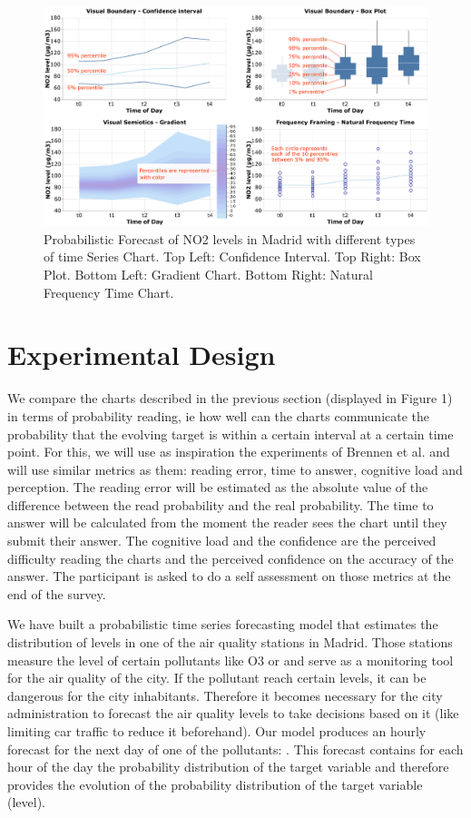 \documentclass[a4paper,3p,sort&compress]{elsarticle}
\begin{document}
\begin{figure}
  \centering
  \includegraphics[width=.9\textwidth]{charts_vector} 
  \caption{\label{figure:charts} Probabilistic Forecast of NO2 levels in Madrid with different types of time Series Chart. 
  Top Left: Confidence Interval. Top Right: Box Plot. 
  Bottom Left: Gradient Chart. Bottom Right: Natural Frequency Time Chart. }
\end{figure} 

\section{Experimental Design}
\label{sec:exp_design}

We compare the charts described in the previous section (displayed in Figure 1) 
in terms of probability 
reading, ie how well 
can the charts communicate the probability that the evolving target is within a certain interval 
at a certain time point.
 For this, we will use as inspiration the experiments of Brennen et al. \cite{brennen_instrument_2018}
and will use similar metrics 
as them: reading error, time to answer, cognitive load and perception. The reading error will be estimated as the 
absolute value of the difference between the read probability and the real probability. The time to answer 
will be calculated from the moment the reader sees the chart until they submit their answer. The cognitive 
load and the confidence are the perceived difficulty reading the charts and the perceived confidence on 
the accuracy of 
the answer. The participant is asked to do a self assessment on those metrics at the end of the survey.

We have built a probabilistic time series forecasting model that estimates the distribution of \no 
levels in one of the air quality stations in Madrid. Those stations measure the level of certain 
pollutants like O3 or \no and serve as a monitoring tool for the air quality of the city. If the pollutant 
reach certain levels, it can be dangerous for the city inhabitants. Therefore it becomes necessary 
for the city administration to 
forecast the air quality levels to take decisions based on it (like limiting car traffic to reduce it beforehand).
Our model produces an hourly forecast for the next day of one of the pollutants: \no. This forecast contains
for each hour of the day the probability distribution of the target variable and therefore provides the evolution 
of the probability distribution of the target variable (\no level).
\end{document}
